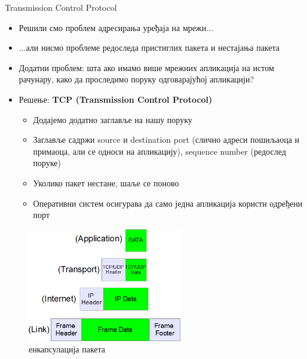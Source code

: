 \documentclass{beamer}
\begin{document}
    \begin{frame}[allowframebreaks]{Transmission Control Protocol}
        \begin{itemize}
            \item Решили смо проблем адресирања уређаја на мрежи...
            \item ...али нисмо проблеме редоследа пристиглих пакета и нестајања пакета
            \item Додатни проблем: шта ако имамо више мрежних апликација на истом рачунару, како да проследимо поруку одговарајућој апликацији?
        \end{itemize}
        
        \framebreak
        
        \begin{itemize}
            \item Решење: \textbf{TCP (Transmission Control Protocol)}
            \begin{itemize}
                \item Додајемо додатно заглавље на нашу поруку
                \item Заглавље садржи source и destination port (слично адреси пошиљаоца и примаоца, али се односи на апликацију), sequence number (редослед поруке)
                \item Уколико пакет нестане, шаље се поново
                \item Оперативни систем осигурава да само једна апликација користи одређени порт
            \end{itemize}
        \end{itemize}
        
        \framebreak
        
        \begin{figure}
            \centering
            \includegraphics[width=0.6\textwidth]{images/enc.png}
            \caption{енкапсулација пакета}
            \label{fig:tcp_enc}
        \end{figure}
        

\end{frame}
\end{document}
